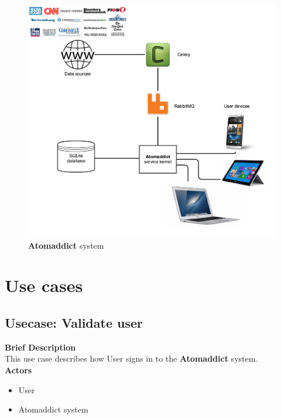 \documentclass[12pt]{article}
\begin{document}
\begin{figure}[H]
    \centering
    \includegraphics[width=\textwidth]{images/systemDiagram.png}
    \caption{\textbf{Atomaddict} system}
    \label{fig:system}
\end{figure}


\section{Use cases}
\subsection{Usecase: Validate user}
\textbf{Brief Description}\\
This use case describes how User signs in to the \textbf{Atomaddict} system.\\


\textbf{Actors}

\begin{itemize}

    \item User

    \item Atomaddict system

\end{itemize}
\end{document}
